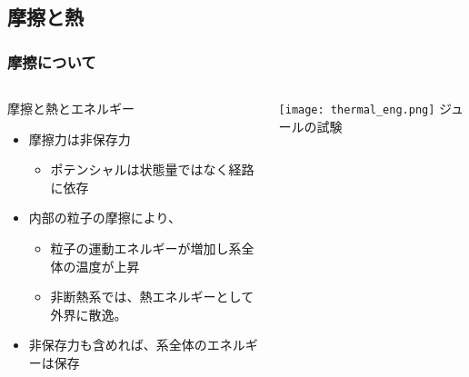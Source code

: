 \documentclass[12pt, dvipdfmx]{beamer}
\begin{document}
\subsection{摩擦と熱}
\begin{frame}
	\frametitle{摩擦について}
		\begin{columns}[T, onlytextwidth]
				\begin{exampleblock}{摩擦と熱とエネルギー}
					\begin{itemize}
						\item 摩擦力は非保存力
							\begin{itemize}
								\item ポテンシャルは状態量ではなく経路に依存
							\end{itemize}
						\item 内部の粒子の摩擦により、
							\begin{itemize}
								\item 粒子の運動エネルギーが増加し系全体の温度が上昇
								\item 非断熱系では、熱エネルギーとして外界に散逸。
							\end{itemize}
						\item 非保存力も含めれば、系全体のエネルギーは保存
					\end{itemize}
				\end{exampleblock}
				\begin{center}
					\texttt{[image: thermal\_eng.png]}
					ジュールの試験
				\end{center}
		\end{columns}
\end{frame}
\end{document}

